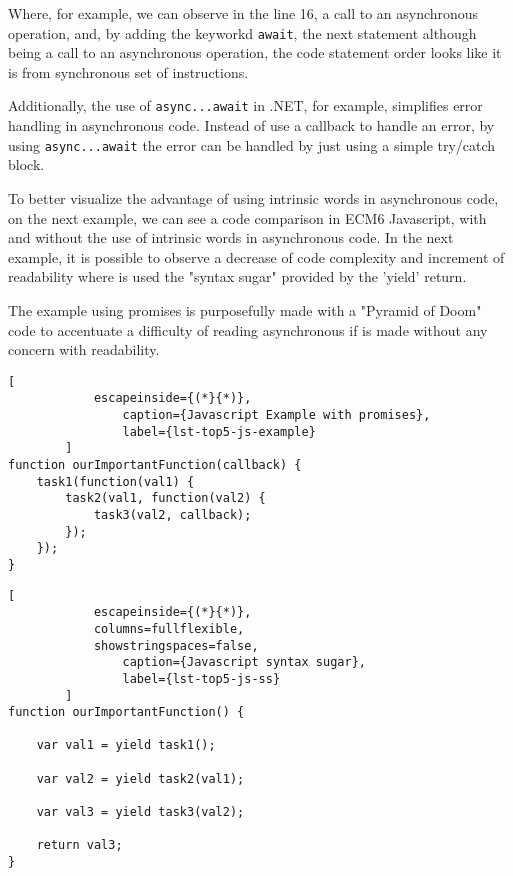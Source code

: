 	Where, for example, we can observe in the line 16, a call to an asynchronous operation, and, by adding the keyworkd \texttt{await}, the next statement although being a call to an asynchronous operation, the code statement order looks like it is from synchronous set of instructions. 
	
	Additionally, the use of \texttt{async...await} in .NET, for example, simplifies error handling in asynchronous code. Instead of use a callback to handle an error, by using \texttt{async...await} the error can be handled by just using a simple try/catch block. 

	
	To better visualize the advantage of using intrinsic words in asynchronous code, on the next example, we can see a code comparison in ECM6 Javascript, with and without the use of intrinsic words in asynchronous code. 
	In the next example, it is possible to observe a decrease of code complexity and increment of readability where is used the "syntax sugar" provided by the 'yield' return. 
	
	The example using promises is purposefully made with a "Pyramid of Doom" code to accentuate a difficulty of reading asynchronous if is made without any concern with readability.
	
	\begin{center}
		\lstset{basicstyle=\scriptsize\ttfamily,frame=bottomline}
		\begin{minipage}[t][][b]{.46\textwidth}
		\begin{lstlisting}[
			escapeinside={(*}{*)},
				caption={Javascript Example with promises},
				label={lst-top5-js-example}
		]
function ourImportantFunction(callback) {
	task1(function(val1) {
		task2(val1, function(val2) {
			task3(val2, callback);
		});
	});
}
		\end{lstlisting}
		\end{minipage}
		\hfill
		\begin{minipage}{.48\textwidth}
		\lstset{basicstyle=\scriptsize\ttfamily,frame=bottomline}
		\begin{lstlisting}[
			escapeinside={(*}{*)},
			columns=fullflexible,
			showstringspaces=false,
				caption={Javascript syntax sugar},
				label={lst-top5-js-ss}
		]
function ourImportantFunction() {
	
	var val1 = yield task1();
	
	var val2 = yield task2(val1);
	
	var val3 = yield task3(val2);

	return val3;
}

		\end{lstlisting}
		\end{minipage}
	\end{center}

